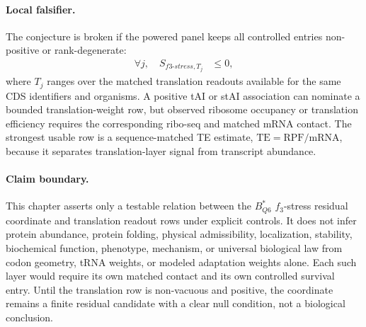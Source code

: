 \paragraph{Local falsifier.}
The conjecture is broken if the powered panel keeps all controlled entries non-positive or rank-degenerate:
$$
\begin{aligned}
\forall j,\quad S_{f3\text{-}stress,T_j} &\leq 0,
\end{aligned}
$$
where $T_j$ ranges over the matched translation readouts available for the same CDS identifiers and organisms. A positive tAI or stAI association can nominate a bounded translation-weight row, but observed ribosome occupancy or translation efficiency requires the corresponding ribo-seq and matched mRNA contact. The strongest usable row is a sequence-matched TE estimate, $\mathrm{TE}=\mathrm{RPF}/\mathrm{mRNA}$, because it separates translation-layer signal from transcript abundance.

\paragraph{Claim boundary.}
This chapter asserts only a testable relation between the $B^{*}_{Q6}$ $f_3$-stress residual coordinate and translation readout rows under explicit controls. It does not infer protein abundance, protein folding, physical admissibility, localization, stability, biochemical function, phenotype, mechanism, or universal biological law from codon geometry, tRNA weights, or modeled adaptation weights alone. Each such layer would require its own matched contact and its own controlled survival entry. Until the translation row is non-vacuous and positive, the coordinate remains a finite residual candidate with a clear null condition, not a biological conclusion.
